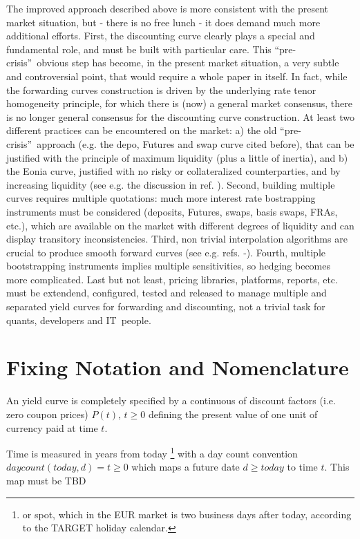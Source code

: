\documentclass[11pt,reqno]{amsart}
\begin{document}
The improved approach described above is more consistent with the present market situation, but - there is no free lunch - it does demand much more additional efforts. First, the discounting curve clearly plays a special and fundamental role, and must be built with particular care. This \textquotedblleft pre-crisis\textquotedblright\ obvious step has become, in the present market situation, a very subtle and controversial point, that would require a whole paper in itself. In fact, while the forwarding curves construction is driven by the underlying rate tenor homogeneity principle, for which there is (now) a general market consensus, there is no longer general consensus for the discounting curve construction. At least two different practices can be encountered on the market: a) the old
\textquotedblleft pre-crisis\textquotedblright\ approach (e.g. the depo, Futures and swap curve cited before), that can be justified with the principle of maximum liquidity (plus a little of inertia), and b) the Eonia curve, justified with no risky or collateralized counterparties, and by increasing liquidity (see e.g. the discussion in ref. \cite{Madigan2008}).
Second, building multiple curves requires multiple quotations: much more interest rate bostrapping instruments must be considered (deposits, Futures, swaps, basis swaps, FRAs, etc.), which are available on the market with different degrees of liquidity and can display transitory inconsistencies.
Third, non trivial interpolation algorithms are crucial to produce smooth forward curves (see e.g. refs. \cite{HaganWest2008}-\cite{Andersen2005}).
Fourth, multiple bootstrapping instruments implies multiple sensitivities, so hedging becomes more complicated. Last but not least, pricing libraries, platforms, reports, etc. must be extendend, configured, tested and released to manage multiple and separated yield curves for forwarding and discounting, not a trivial task for quants, developers and IT\ people.


\section{Fixing Notation and Nomenclature}

An yield curve is completely specified by a continuous of discount factors (i.e. zero coupon prices) $P(t) $, $t\geq 0$ defining the present value of one unit of currency paid at time $t$.

Time is measured in years from today \footnote{or spot, which in the EUR market is two business days after today, according to the TARGET holiday calendar.} with a day count convention $daycount\left(
today,d\right) =t\geq 0$ which maps a future date $d\geq today$ to time $t$.
This map must be TBD
\end{document}
